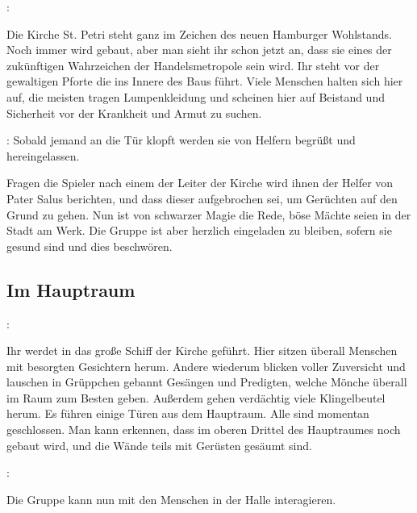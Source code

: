 
:

Die Kirche St. Petri steht ganz im Zeichen des neuen Hamburger Wohlstands. Noch immer wird gebaut, aber man sieht ihr schon jetzt an, dass sie eines der zukünftigen Wahrzeichen der Handelsmetropole sein wird. Ihr steht vor der gewaltigen Pforte die ins Innere des Baus führt. Viele Menschen halten sich hier auf, die meisten tragen Lumpenkleidung und scheinen hier auf Beistand und Sicherheit vor der Krankheit und Armut zu suchen.

: Sobald jemand an die Tür klopft werden sie von Helfern begrüßt und hereingelassen.



Fragen die Spieler nach einem der Leiter der Kirche wird ihnen der Helfer von Pater Salus berichten, und dass dieser aufgebrochen sei, um Gerüchten auf den Grund zu gehen.
Nun ist von schwarzer Magie die Rede, böse Mächte seien in der Stadt am Werk. Die Gruppe ist aber herzlich eingeladen zu bleiben, sofern sie gesund sind und dies beschwören.

\subsection{Im Hauptraum}
\label{hauptraum}

:

Ihr werdet in das große Schiff der Kirche geführt. Hier sitzen überall Menschen mit besorgten Gesichtern herum. Andere wiederum blicken voller Zuversicht und lauschen in Grüppchen gebannt Gesängen und Predigten, welche Mönche überall im Raum zum Besten geben. Außerdem gehen verdächtig viele Klingelbeutel herum. Es führen einige Türen aus dem Hauptraum. Alle sind momentan geschlossen. Man kann erkennen, dass im oberen Drittel des Hauptraumes noch gebaut wird, und die Wände teils mit Gerüsten gesäumt sind.

:

Die Gruppe kann nun mit den Menschen in der Halle interagieren.

